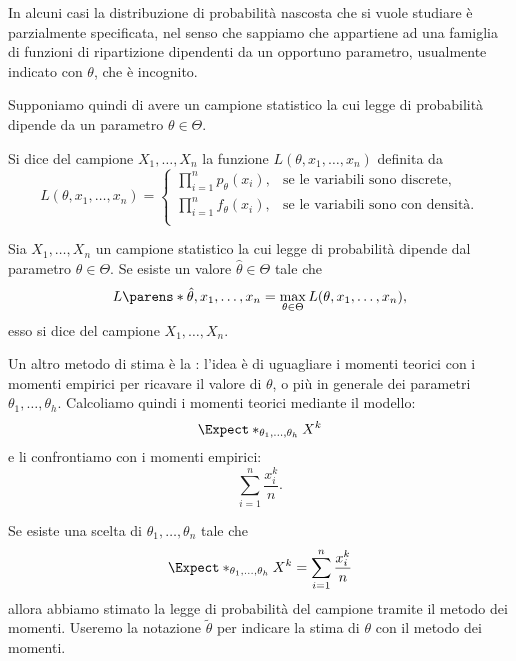 In alcuni casi la distribuzione di probabilità nascosta che si vuole studiare è parzialmente specificata, nel senso che sappiamo che appartiene ad una famiglia di funzioni di ripartizione dipendenti da un opportuno parametro, usualmente indicato con $\theta$, che è incognito.

Supponiamo quindi di avere un campione statistico la cui legge di probabilità dipende da un parametro $\theta \in \Theta$.
\begin{definition}
    [Verosimiglianza] Si dice  del campione $X_1, \dots, X_n$ la funzione $L(\theta, x_1, \dots, x_n)$ definita da \[
        L(\theta, x_1, \dots, x_n) = \begin{cases}
            \displaystyle \prod_{i = 1}^n p_\theta(x_i), &\text{se le variabili sono discrete},\\[7pt]
            \displaystyle \prod_{i = 1}^n f_\theta(x_i), &\text{se le variabili sono con densità.}\\[5pt]
        \end{cases}  
    \]
\end{definition}

\begin{definition}
     Sia $X_1, \dots, X_n$ un campione statistico la cui legge di probabilità dipende dal parametro $\theta \in \Theta$. Se esiste un valore $\hat\theta \in \Theta$ tale che \[
        L\parens*{\hat\theta, x_1, \dots, x_n} = \max_{\theta \in \Theta} L(\theta, x_1, \dots, x_n),
    \] esso si dice  del campione $X_1, \dots, X_n$.
\end{definition}

Un altro metodo di stima è la : l'idea è di uguagliare i momenti teorici con i momenti empirici per ricavare il valore di $\theta$, o più in generale dei parametri $\theta_1, \dots, \theta_h$. Calcoliamo quindi i momenti teorici mediante il modello: \[
    \Expect*_{\theta_1, \dots, \theta_h}{X^k}        
\] e li confrontiamo con i momenti empirici: \[
    \sum_{i=1}^n \frac{x_i^k}{n}.    
\] 

Se esiste una scelta di $\theta_1, \dots, \theta_n$ tale che \[
    \Expect*_{\theta_1, \dots, \theta_h}{X^k} = \sum_{i=1}^n \frac{x_i^k}{n}
\] allora abbiamo stimato la legge di probabilità del campione tramite il metodo dei momenti. Useremo la notazione $\tilde\theta$ per indicare la stima di $\theta$ con il metodo dei momenti.

